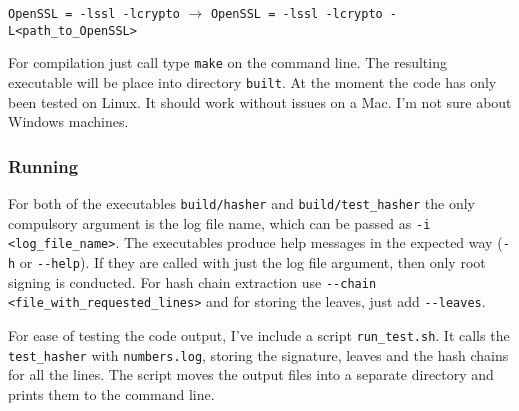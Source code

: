 \documentclass[11pt]{article}
\newcommand{\ct}[1]{\texttt{#1}}
\begin{document}
\begin{center}\ct{OpenSSL = -lssl -lcrypto} \hspace{2pt} $\rightarrow$ \hspace{2pt} \ct{OpenSSL = -lssl -lcrypto -L<path\_to\_OpenSSL>}\end{center}

For compilation just call type \ct{make} on the command line. The resulting executable will be place into directory \ct{built}. At the moment the code has only been tested on Linux. It should work without issues on a Mac. I'm not sure about Windows machines. 


\subsubsection{Running} %
\label{ssub:running}

For both of the executables \ct{build/hasher} and \ct{build/test\_hasher} the only compulsory argument is the log file name, which can be passed as \ct{-i <log\_file\_name>}. The executables produce help messages in the expected way (\ct{-h} or \ct{-{}-help}). If they are called with just the log file argument, then only root signing is conducted. For hash chain extraction use \ct{-{}-chain <file\_with\_requested\_lines>} and for storing the leaves, just add \ct{-{}-leaves}.  

For ease of testing the code output, I've include a script \ct{run\_test.sh}. It calls the \ct{test\_hasher} with \ct{numbers.log}, storing the signature, leaves and the hash chains for all the lines. The script moves the output files into a separate directory and prints them to the command line.  





\end{document}
